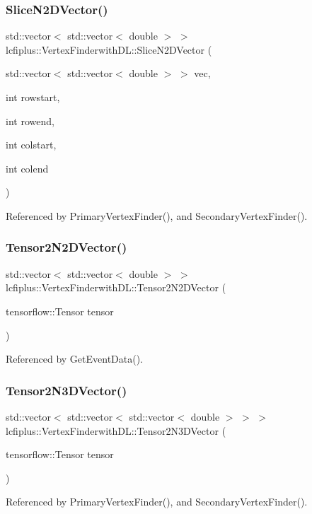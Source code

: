 \subsubsection{Slice\+N2\+D\+Vector()}
{\footnotesize\ttfamily std\+::vector$<$ std\+::vector$<$ double $>$ $>$ lcfiplus\+::\+Vertex\+Finderwith\+D\+L\+::\+Slice\+N2\+D\+Vector (\begin{DoxyParamCaption}\item[{std\+::vector$<$ std\+::vector$<$ double $>$ $>$}]{vec,  }\item[{int}]{rowstart,  }\item[{int}]{rowend,  }\item[{int}]{colstart,  }\item[{int}]{colend }\end{DoxyParamCaption})}



Referenced by Primary\+Vertex\+Finder(), and Secondary\+Vertex\+Finder().

\mbox{\label{namespacelcfiplus_1_1VertexFinderwithDL_a6d9daefa2746d9b0e044cc158ff91ea4}} 
\subsubsection{Tensor2\+N2\+D\+Vector()}
{\footnotesize\ttfamily std\+::vector$<$ std\+::vector$<$ double $>$ $>$ lcfiplus\+::\+Vertex\+Finderwith\+D\+L\+::\+Tensor2\+N2\+D\+Vector (\begin{DoxyParamCaption}\item[{tensorflow\+::\+Tensor}]{tensor }\end{DoxyParamCaption})}



Referenced by Get\+Event\+Data().

\mbox{\label{namespacelcfiplus_1_1VertexFinderwithDL_ad2ccb431dbf59b7081534aebd8e55e18}} 
\subsubsection{Tensor2\+N3\+D\+Vector()}
{\footnotesize\ttfamily std\+::vector$<$ std\+::vector$<$ std\+::vector$<$ double $>$ $>$ $>$ lcfiplus\+::\+Vertex\+Finderwith\+D\+L\+::\+Tensor2\+N3\+D\+Vector (\begin{DoxyParamCaption}\item[{tensorflow\+::\+Tensor}]{tensor }\end{DoxyParamCaption})}



Referenced by Primary\+Vertex\+Finder(), and Secondary\+Vertex\+Finder().

